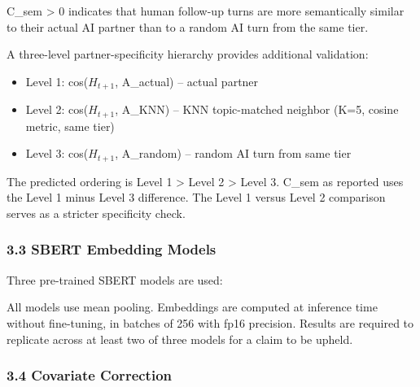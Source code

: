 C\_sem > 0 indicates that human follow-up turns are more semantically similar to their actual AI partner than to a random AI turn from the same tier.

A three-level partner-specificity hierarchy provides additional validation:

\begin{itemize}
\item Level 1: cos($H_{t+1}$, A\_actual) -- actual partner
\item Level 2: cos($H_{t+1}$, A\_KNN) -- KNN topic-matched neighbor (K=5, cosine metric, same tier)
\item Level 3: cos($H_{t+1}$, A\_random) -- random AI turn from same tier
\end{itemize}

The predicted ordering is Level 1 > Level 2 > Level 3. C\_sem as reported uses the Level 1 minus Level 3 difference. The Level 1 versus Level 2 comparison serves as a stricter specificity check.

\subsubsection{3.3 SBERT Embedding Models}

Three pre-trained SBERT models are used:

\begin{table}[htbp]
\centering
{}
\end{table}

All models use mean pooling. Embeddings are computed at inference time without fine-tuning, in batches of 256 with fp16 precision. Results are required to replicate across at least two of three models for a claim to be upheld.

\subsubsection{3.4 Covariate Correction}

